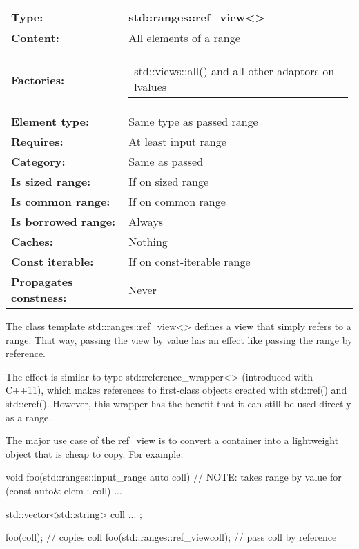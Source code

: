\begin{longtable}[c]{|l|l|}
\hline
\textbf{Type:}                 & std::ranges::ref\_view\textless{}\textgreater{} \\ \hline
\endfirsthead
%
\endhead
%
\textbf{Content:}              & All elements of a range   \\ \hline
\textbf{Factories:}      & \begin{tabular}[c]{@{}l@{}}std::views::all() and all other adaptors on lvalues\end{tabular} \\ \hline
\textbf{Element type:}         & Same type as passed range                 \\ \hline
\textbf{Requires:}             & At least input range                       \\ \hline
\textbf{Category:}             & Same as passed                                 \\ \hline
\textbf{Is sized range:} & If on sized range                                                \\ \hline
\textbf{Is common range:}      & If on common range                         \\ \hline
\textbf{Is borrowed range:}    & Always                                         \\ \hline
\textbf{Caches:}               & Nothing                                        \\ \hline
\textbf{Const iterable:}       & If on const-iterable range               \\ \hline
\textbf{Propagates constness:} & Never                                          \\ \hline
\end{longtable}

The class template std::ranges::ref\_view<> defines a view that simply refers to a range. That way, passing the view by value has an effect like passing the range by reference.

The effect is similar to type std::reference\_wrapper<> (introduced with C++11), which makes references to first-class objects created with std::ref() and std::cref(). However, this wrapper has the benefit that it can still be used directly as a range.

The major use case of the ref\_view is to convert a container into a lightweight object that is cheap to copy. For example:

\begin{cpp}
void foo(std::ranges::input_range auto coll) // NOTE: takes range by value
{
	for (const auto& elem : coll) {
		...
	}
}

std::vector<std::string> coll{ ... };

foo(coll); // copies coll
foo(std::ranges::ref_view{coll}); // pass coll by reference
\end{cpp}


